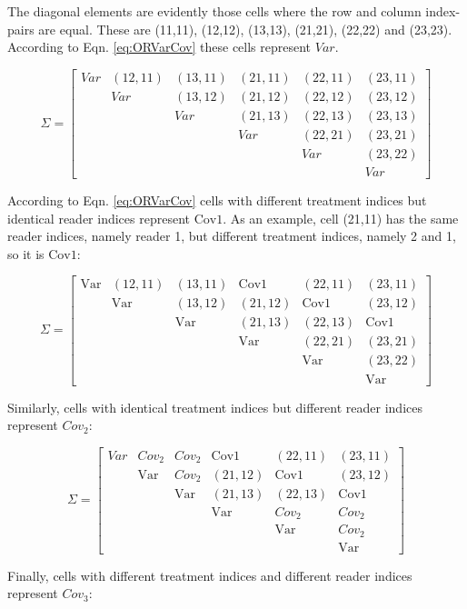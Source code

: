 \documentclass[
]{book}
\begin{document}
The diagonal elements are evidently those cells where the row and column index-pairs are equal. These are (11,11), (12,12), (13,13), (21,21), (22,22) and (23,23). According to Eqn. \eqref{eq:ORVarCov} these cells represent \(Var\).

\[
\Sigma=
\begin{bmatrix}
Var & (12,11) & (13,11) & (21,11) & (22,11) & (23,11) \\
& Var & (13,12) & (21,12) & (22,12) & (23,12) \\ 
& & Var & (21,13) & (22,13) & (23,13) \\ 
& & & Var & (22,21) & (23,21) \\
& & & & Var & (23,22) \\ 
& & & & & Var
\end{bmatrix}
\]

According to Eqn. \eqref{eq:ORVarCov} cells with different treatment indices but identical reader indices represent \(\text{Cov1}\). As an example, cell (21,11) has the same reader indices, namely reader 1, but different treatment indices, namely 2 and 1, so it is \(\text{Cov1}\):

\[
\Sigma=
\begin{bmatrix}
\text{Var} & (12,11) & (13,11) & \text{Cov1} & (22,11) & (23,11) \\
& \text{Var} & (13,12) & (21,12) & \text{Cov1} & (23,12) \\ 
& & \text{Var} & (21,13) & (22,13) & \text{Cov1} \\ 
& & & \text{Var} & (22,21) & (23,21) \\
& & & & \text{Var} & (23,22) \\ 
& & & & & \text{Var}
\end{bmatrix}
\]

Similarly, cells with identical treatment indices but different reader indices represent \(Cov_2\):

\[
\Sigma=
\begin{bmatrix}
Var & Cov_2 & Cov_2 & \text{Cov1} & (22,11) & (23,11) \\
& \text{Var} & Cov_2 & (21,12) & \text{Cov1} & (23,12) \\ 
&  & \text{Var} & (21,13) & (22,13) & \text{Cov1} \\ 
&  &  & \text{Var} & Cov_2 & Cov_2 \\
&  &  &  & \text{Var} & Cov_2 \\ 
&  &  &  &  & \text{Var}
\end{bmatrix}
\]

Finally, cells with different treatment indices and different reader indices represent \(Cov_3\):
\end{document}
